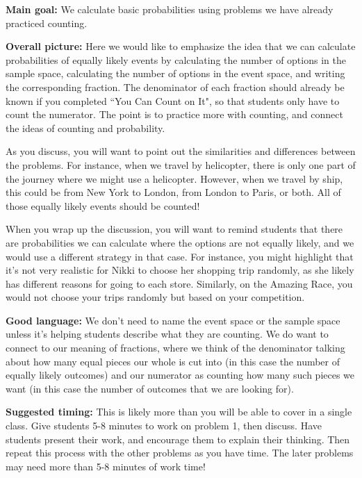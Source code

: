 \documentclass[noauthor,nooutcomes]{ximera}
\begin{document}
\begin{instructorNotes}
{\bf Main goal:} We calculate basic probabilities using problems we have already practiced counting.

{\bf Overall picture:} 
Here we would like to emphasize the idea that we can calculate probabilities of equally likely events by calculating the number of options in the sample space, calculating the number of options in the event space, and writing the corresponding fraction. The denominator of each fraction should already be known if you completed ``You Can Count on It", so that students only have to count the numerator. The point is to practice more with counting, and connect the ideas of counting and probability.

As you discuss, you will want to point out the similarities and differences between the problems. For instance, when we travel by helicopter, there is only one part of the journey where we might use a helicopter. However, when we travel by ship, this could be from New York to London, from London to Paris, or both. All of those equally likely events should be counted!

When you wrap up the discussion, you will want to remind students that there are probabilities we can calculate where the options are not equally likely, and we would use a different strategy in that case. For instance, you might highlight that it's not very realistic for Nikki to choose her shopping trip randomly, as she likely has different reasons for going to each store. Similarly, on the Amazing Race, you would not choose your trips randomly but based on your competition.




{\bf Good language:} We don't need to name the event space or the sample space unless it's helping students describe what they are counting. We do want to connect to our meaning of fractions, where we think of the denominator talking about how many equal pieces our whole is cut into (in this case the number of equally likely outcomes) and our numerator as counting how many such pieces we want (in this case the number of outcomes that we are looking for). 

{\bf Suggested timing:}  This is likely more than you will be able to cover in a single class. Give students 5-8 minutes to work on problem 1, then discuss. Have students present their work, and encourage them to explain their thinking. Then repeat this process with the other problems as you have time. The later problems may need more than 5-8 minutes of work time!


\end{instructorNotes}
\end{document}
